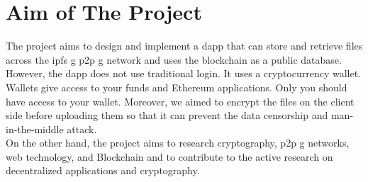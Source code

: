 \section{Aim of The Project}

The project aims to design and implement a \acrlong{dapp} that can store and retrieve files across the \gls{ipfs g} \gls{p2p g} network and uses the \Gls{blockchain} as a public database. However, the \acrlong{dapp} does not use traditional login. It uses a \gls{cryptocurrency} \gls{wallet}. Wallets give access to your funds and Ethereum applications. Only you should have access to your wallet. Moreover, we aimed to encrypt the files on the client side before uploading them so that it can prevent the data censorship and man-in-the-middle attack. \\[-8pt]

On the other hand, the project aims to research cryptography, \gls{p2p g} networks, web technology, and Blockchain and to contribute to the active research on decentralized applications and cryptography.